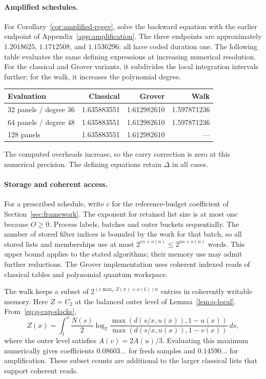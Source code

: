 \documentclass[runningheads,envcountsame,envcountsect,orivec]{llncs}
\begin{document}
\paragraph{Amplified schedules.}
For Corollary~\ref{cor:amplified-regev}, solve the backward equation
with the earlier endpoint of Appendix~\ref{app:amplification}.
The three endpoints are approximately $1.2018625$, $1.1712508$,
and $1.1536296$; all have coded duration one. The following
table evaluates the same defining expressions
at increasing numerical resolution. For the classical and Grover
variants, it subdivides the local integration intervals further;
for the walk, it increases the polynomial degree.
\begin{center}
\small
\begin{tabular}{@{}lrrr@{}}
\toprule
Evaluation & Classical & Grover & Walk\\
\midrule
32 panels / degree 36 & 1.635883551 & 1.612982610 & 1.597871236\\
64 panels / degree 48 & 1.635883551 & 1.612982610 & 1.597871236\\
128 panels & 1.635883551 & 1.612982610 & ---\\
\bottomrule
\end{tabular}
\end{center}
The computed overheads increase, so the carry correction is
zero at this numerical precision. The defining equations retain
$\Delta$ in all cases.

\paragraph{Storage and coherent access.}
For a prescribed schedule, write $c$ for the reference-budget
coefficient of Section~\ref{sec:framework}.
The exponent for retained list size is at most one because $O\ge0$.
Process labels, batches and outer buckets sequentially. The
number of stored filter indices is bounded by the work for
that batch, so all stored lists and
memberships use at most $2^{cn+o(n)}\le2^{an+o(n)}$ words.
This upper bound applies to the stated algorithms; their
memory use may admit further reductions. The Grover
implementation uses coherent indexed reads of classical tables and polynomial quantum workspace.

The walk keeps a subset of $2^{(c\max_xZ(x)+o(1))n}$ entries
in coherently writable memory. Here $Z=C_2$ at the balanced outer
level of Lemma~\ref{lem:q-local}. From~\eqref{eq:q-cap-slacks},
\[
 Z(x)=\int_1^x\frac{N(s)}2\log_2
 \frac{\max(d(s/x,u(x)),1-u(x))}
      {\max(d(s/x,u(x)),1-v(x))}\,ds,
\]
where the outer level satisfies $A(v)=2A(u)/3$.
Evaluating this maximum numerically gives coefficients
$0.08603\ldots$ for fresh samples and $0.14590\ldots$ for
amplification. These subset counts are additional to the larger
classical lists that support coherent reads.
\end{document}
